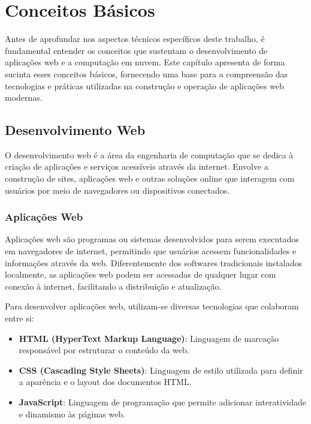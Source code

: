 \section{Conceitos Básicos}

Antes de aprofundar nos aspectos técnicos específicos deste trabalho, é fundamental entender os conceitos que sustentam o desenvolvimento de aplicações web e a computação em nuvem. Este capítulo apresenta de forma sucinta esses conceitos básicos, fornecendo uma base para a compreensão das tecnologias e práticas utilizadas na construção e operação de aplicações web modernas.

\subsection{Desenvolvimento Web}

O desenvolvimento web é a área da engenharia de computação que se dedica à criação de aplicações e serviços acessíveis através da internet. Envolve a construção de sites, aplicações web e outras soluções online que interagem com usuários por meio de navegadores ou dispositivos conectados.

\subsubsection{Aplicações Web}


Aplicações web são programas ou sistemas desenvolvidos para serem executados em navegadores de internet, permitindo que usuários acessem funcionalidades e informações através da web. Diferentemente dos softwares tradicionais instalados localmente, as aplicações web podem ser acessadas de qualquer lugar com conexão à internet, facilitando a distribuição e atualização.

Para desenvolver aplicações web, utilizam-se diversas tecnologias que colaboram entre si:

\begin{itemize}
    \item \textbf{HTML (HyperText Markup Language)}: Linguagem de marcação responsável por estruturar o conteúdo da web.
    \item \textbf{CSS (Cascading Style Sheets)}: Linguagem de estilo utilizada para definir a aparência e o layout dos documentos HTML.
    \item \textbf{JavaScript}: Linguagem de programação que permite adicionar interatividade e dinamismo às páginas web.
\end{itemize}

